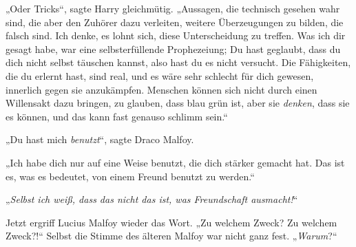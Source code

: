 „Oder Tricks“, sagte Harry gleichmütig.
„Aussagen, die technisch gesehen wahr sind, die aber den Zuhörer dazu verleiten, weitere Überzeugungen zu bilden, die falsch sind. Ich denke, es lohnt sich, diese Unterscheidung zu treffen. Was ich dir gesagt habe, war eine selbsterfüllende Prophezeiung; Du hast geglaubt, dass du dich nicht selbst täuschen kannst, also hast du es nicht versucht. Die Fähigkeiten, die du erlernt hast, sind real, und es wäre sehr schlecht für dich gewesen, innerlich gegen sie anzukämpfen. Menschen können sich nicht durch einen Willensakt dazu bringen, zu glauben, dass blau grün ist, aber sie \emph{denken}, dass sie es können, und das kann fast genauso schlimm sein.“

„Du hast mich \emph{benutzt}“, sagte Draco Malfoy.

„Ich habe dich nur auf eine Weise benutzt, die dich stärker gemacht hat. Das ist es, was es bedeutet, von einem Freund benutzt zu werden.“

„\emph{Selbst ich weiß, dass das nicht das ist, was Freundschaft ausmacht!}“

Jetzt ergriff Lucius Malfoy wieder das Wort.
„Zu welchem Zweck? Zu welchem Zweck?!“ Selbst die Stimme des älteren Malfoy war nicht ganz fest.
„\emph{Warum}?“

